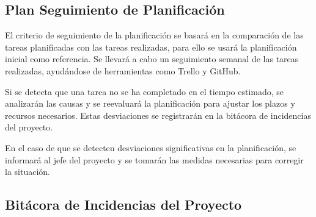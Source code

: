 \subsection{Plan Seguimiento de Planificación}
El criterio de seguimiento de la planificación se basará en la comparación de las tareas planificadas con las tareas realizadas, 
para ello se usará la planificación inicial como referencia. 
Se llevará a cabo un seguimiento semanal de las tareas realizadas, ayudándose de herramientas como Trello
 y GitHub.

Si se detecta que una tarea no se ha completado en el tiempo estimado, se analizarán las causas y se reevaluará la planificación para ajustar los plazos 
y recursos necesarios. Estas desviaciones se registrarán en la bitácora de incidencias del proyecto.

En el caso de que se detecten desviaciones significativas en la planificación, se informará al jefe del proyecto y se tomarán las medidas necesarias 
para corregir la situación.

\subsection{Bitácora de Incidencias del Proyecto}

